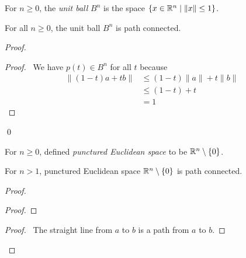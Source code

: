 \begin{definition}
    For $n \geq 0$, the \emph{unit ball} $B^n$ is the space $\{ x \in \mathbb{R}^n \mid \| x \| \leq 1 \}$.
\end{definition}

\begin{proposition}
    For all $n \geq 0$, the unit ball $B^n$ is path connected.
\end{proposition}

\begin{proof}
    \pf
    \begin{proof}
        \pf\ We have $p(t) \in B^n$ for all $t$ because
        \begin{align*}
            \| (1-t)a + tb \| & \leq (1-t) \| a \| + t \| b \| \\
            & \leq (1-t) + t \\
            & = 1
        \end{align*}
    \end{proof}
    \qed
\end{proof}

\begin{definition}
    For $n \geq 0$, defined \emph{punctured Euclidean space} to be $\mathbb{R}^n \setminus \{ 0 \}$.
\end{definition}

\begin{proposition}
    For $n > 1$, punctured Euclidean space $\mathbb{R}^n \setminus \{ 0 \}$ is path connected.
\end{proposition}

\begin{proof}
    \pf
    \begin{proof}
    \end{proof}
    \begin{proof}
        \pf\ The straight line from $a$ to $b$ is a path from $a$ to $b$.
    \end{proof}
\end{proof}


